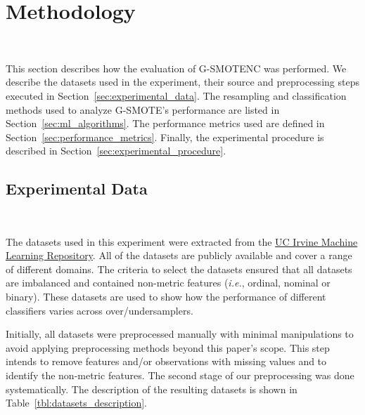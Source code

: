 \documentclass[preprint,12pt]{elsarticle}
\begin{document}
{\begin{algorithm}

\end{algorithm}


\section{Methodology}~\label{sec:methodology}

This section describes how the evaluation of G-SMOTENC was performed. We
describe the datasets used in the experiment, their source and preprocessing
steps executed in Section~\ref{sec:experimental_data}. The resampling and
classification methods used to analyze G-SMOTE's performance are listed in
Section~\ref{sec:ml_algorithms}. The performance metrics used are defined in
Section~\ref{sec:performance_metrics}. Finally, the experimental procedure is
described in Section~\ref{sec:experimental_procedure}.

\subsection{Experimental Data}~\label{sec:experimental_data}

The datasets used in this experiment were extracted from the
\href{https://archive.ics.uci.edu}{UC Irvine Machine Learning Repository}. All
of the datasets are publicly available and cover a range of different domains.
The criteria to select the datasets ensured that all datasets are imbalanced
and contained non-metric features (\textit{i.e.}, ordinal, nominal or binary).
These datasets are used to show how the performance of different
classifiers varies across over/undersamplers.

Initially, all datasets were preprocessed manually with minimal manipulations
to avoid applying preprocessing methods beyond this paper's scope. This step
intends to remove features and/or observations with missing values and to
identify the non-metric features. The second stage of our preprocessing was
done systematically. The description of the resulting datasets is shown in
Table~\ref{tbl:datasets_description}.

}
\end{document}
